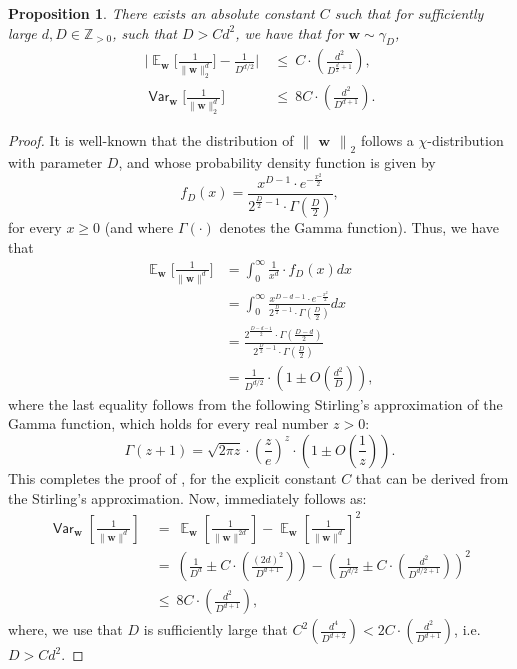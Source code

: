 \documentclass[11pt]{article}
\newcommand{\inparen}[1]{\left ( #1 \right )}
\newcommand{\insquare}[1]{\left [ #1 \right ]}
\newcommand{\norm}[2]{\begin{Vmatrix} #2 \end{Vmatrix}_{#1}}
\DeclareMathOperator*{\Ex}{\mathbb{E}}
\DeclareMathOperator*{\Var}{\mathsf{Var}}
\newcommand{\bbZ}{{\mathbb Z}}
\newcommand{\bw}{{\bm w}}
\newtheorem{proposition}[theorem]{Proposition}
\begin{document}
\begin{proposition}\label{prop:inv_chi_mom_dist}
	There exists an absolute constant $C$ such that for sufficiently large $d, D \in \bbZ_{> 0}$, such that $D > Cd^2$, we have that for $\bw \sim \gamma_D$,
	\begin{align}
	\bigg| \Ex_{\bw}\bigg[\frac{1}{\|\bw\|_2^d}\bigg] - \frac{1}{D^{d/2}} \bigg| &~\le~ C \cdot \inparen{\frac{d^2}{D^{\frac{d}{2}+1}}}, \label{eq:mean_univ_bd}\\
	\Var_{\bw}\bigg[ \frac{1}{\| \bw \|_2^d}\bigg] &~\le~ 8 C \cdot \inparen{\frac{d^2}{D^{d+1}}}.\label{eq:var_univ_bd}
	\end{align}
\end{proposition}
\begin{proof}%
	It is well-known that the distribution of $\norm{2}{\bw}$ follows a $\chi$-distribution with parameter $D$, and whose probability density function is given by
	\begin{equation*}
		f_D(x) = \frac{x^{D-1} \cdot e^{- \frac{x^2}{2}}}{2^{\frac{D}{2} - 1} \cdot \Gamma(\frac{D}{2})},
	\end{equation*}
	for every $x \geq 0$ (and where $\Gamma(\cdot)$ denotes the Gamma function). Thus, we have that
	\begin{align*}
		\Ex_{\bw}\bigg[\frac{1}{\|\bw\|^d}\bigg] &= \int_{0}^{\infty} \frac{1}{x^d} \cdot f_D(x) dx\\ 
		&=  \int_{0}^{\infty} \frac{x^{D-d-1} \cdot e^{- \frac{x^2}{2}}}{2^{\frac{D}{2} - 1} \cdot \Gamma(\frac{D}{2})} dx\\ 
		&= \frac{2^{\frac{D-d-1}{2}} \cdot \Gamma\inparen{\frac{D-d}{2}}}{2^{\frac{D}{2} - 1} \cdot \Gamma(\frac{D}{2})}\\ 
		&= \frac{1}{D^{d/2}} \cdot \inparen{1 \pm O\inparen{\frac{d^2}{D}}},
	\end{align*}
	where the last equality follows from the following Stirling's approximation of the Gamma function, which holds for every real number $z > 0$:
	\[ \Gamma(z+1) = \sqrt{ 2 \pi z } \cdot \inparen{\frac{z}{e}}^z \cdot \inparen{1 \pm O\inparen{\frac{1}{z}}}. \]
	This completes the proof of , for the explicit constant $C$ that can be derived from the Stirling's approximation. Now,  immediately follows as:
	\begin{align*}
		\Var_{\bw}\insquare{\frac{1}{\| \bw \|^d}} &~=~ \Ex_{\bw} \insquare{\frac{1}{\|\bw\|^{2d}}} -  \Ex_{\bw}\insquare{\frac{1}{\|\bw\|^d}}^2\\ 
		&~=~ \inparen{\frac{1}{D^d} \pm C \cdot \inparen{\frac{(2d)^2}{D^{d+1}}}} - \inparen{\frac{1}{D^{d/2}} \pm C \cdot \inparen{\frac{d^2}{D^{d/2+1}}}}^2\\ 
		&~\le~ 8C \cdot \inparen{\frac{d^2}{D^{d+1}}},
	\end{align*}
	where, we use that $D$ is sufficiently large that $C^2 \inparen{\frac{d^4}{D^{d+2}}} < 2C \cdot \inparen{\frac{d^2}{D^{d+1}}}$, i.e. $D > Cd^2$.
\end{proof}
\end{document}
